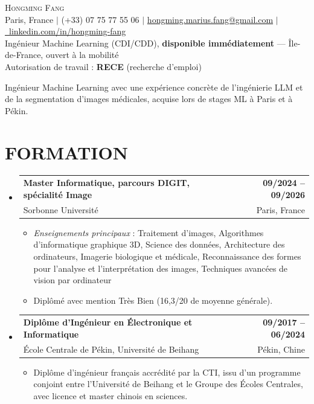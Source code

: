 \documentclass[a4paper,11pt]{article}
\makeatletter
\let\oldsection\section
\renewcommand{\section}[1]{\needspace{5\baselineskip}\oldsection{#1}}
\newcommand{\resumeItem}[1]{
  \item\small{
    {#1\vspace{-1pt}}
  }
}
\newcommand{\resumeSubheading}[4]{
  \vspace{-2pt plus 12pt}\item
    \begin{tabular*}{1.0\textwidth}[t]{l@{\extracolsep{\fill}}r}
      \textbf{#1} & \textbf{#2} \\
      {#3} & \textnormal{#4} \\
    \end{tabular*}\vspace{-7pt}\nopagebreak[4]
}
\newcommand{\resumeSubHeadingListStart}{\begin{itemize}[leftmargin=0.0in, label={}]}
\newcommand{\resumeSubHeadingListEnd}{\end{itemize}}
\newcommand{\resumeItemListStart}{\begin{itemize}}
\newcommand{\resumeItemListEnd}{\end{itemize}\vspace{-5pt}}
\makeatother
\begin{document}
\vspace*{-0.2in}
\begin{center}
    {\LARGE \scshape Hongming Fang} \\[2pt]
    \small Paris, France $|$ (+33) 07 75 77 55 06 $|$
    \href{mailto:hongming.marius.fang@gmail.com}{hongming.marius.fang@gmail.com} $|$
    \href{https://linkedin.com/in/hongming-fang}{\raisebox{-0.2\height}\faLinkedin\ linkedin.com/in/hongming-fang} \\
    {Ingénieur Machine Learning (CDI/CDD), \textbf{disponible immédiatement} — Île-de-France, ouvert à la mobilité} \\
    {Autorisation de travail : \textbf{RECE} (recherche d'emploi)}
    \vspace{-5pt}
\end{center}

\noindent\small{Ingénieur Machine Learning avec une expérience concrète de l'ingénierie LLM et de la segmentation d'images médicales, acquise lors de stages ML à Paris et à Pékin.}\par
\vspace{-4pt}
\vspace{6pt}

\section{FORMATION}
  \resumeSubHeadingListStart
    \resumeSubheading
    {Master Informatique, parcours DIGIT, spécialité Image}{09/2024 -- 09/2026}
    {Sorbonne Université}{Paris, France}
    \resumeItemListStart
     \resumeItem{\textit{Enseignements principaux} : Traitement d'images, Algorithmes d'informatique graphique 3D, Science des données, Architecture des ordinateurs, Imagerie biologique et médicale, Reconnaissance des formes pour l'analyse et l'interprétation des images, Techniques avancées de vision par ordinateur}
     \resumeItem{Diplômé avec mention Très Bien (16,3/20 de moyenne générale).}
    \resumeItemListEnd

    \resumeSubheading
      {Diplôme d'Ingénieur en Électronique et Informatique}{09/2017 -- 06/2024}
      {École Centrale de Pékin, Université de Beihang}{Pékin, Chine}
    \resumeItemListStart
        \resumeItem{Diplôme d'ingénieur français accrédité par la CTI, issu d'un programme conjoint entre l'Université de Beihang et le Groupe des Écoles Centrales, avec licence et master chinois en sciences.}
    \resumeItemListEnd
  \resumeSubHeadingListEnd
\end{document}
